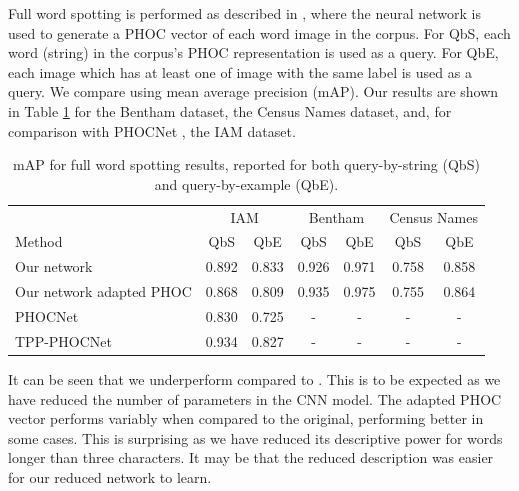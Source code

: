 \documentclass[ms,electronic,twosidetoc,letterpaper,chaptercenter,parttop,lof,lot]{byumsphd}
\begin{document}
Full word spotting is performed as described in \cite{sudholt2016}, where the neural network is used to generate a PHOC vector of each word image in the corpus. For QbS, each word (string) in the corpus's PHOC representation is used as a query. For QbE, each image which has at least one of image with the same label is used as a query. We compare using mean average precision (mAP). Our results are shown in Table \ref{tab:wordspottingresults} for the Bentham dataset, the Census Names dataset, and, for comparison with PHOCNet \cite{sudholt2016,sudholt2017}, the IAM dataset.

\begin{table}
\centering
\begin{tabular}{| l | c  c | c c | c c |}
  \hline
   & \multicolumn{2}{c|}{IAM} & \multicolumn{2}{c|}{Bentham} & \multicolumn{2}{c|}{Census Names}\\
  Method & QbS & QbE & QbS & QbE & QbS & QbE\\
  \hline		
  Our network  &  0.892 & 0.833  &  0.926 & 0.971  &  0.758 & 0.858  \\%
  Our network adapted PHOC  &  0.868 & 0.809  &  0.935 & 0.975  &  0.755 & 0.864 \\
  
  PHOCNet\cite{sudholt2016} & 0.830 & 0.725 & - & - & - & - \\
  TPP-PHOCNet\cite{sudholt2017} & 0.934 & 0.827 & - & - & - & - \\
  \hline  
\end{tabular}
\caption{mAP for full word spotting results, reported for both query-by-string (QbS) and query-by-example (QbE).}
\label{tab:wordspottingresults}
\end{table}

It can be seen that we underperform compared to \cite{sudholt2017}. This is to be expected as we have reduced the number of parameters in the  	CNN model. The adapted PHOC vector performs variably when compared to the original,  performing better in some cases. This is surprising as we have reduced its descriptive power for words longer than three characters. It may be that the reduced description was easier for our reduced network to learn.
\end{document}
